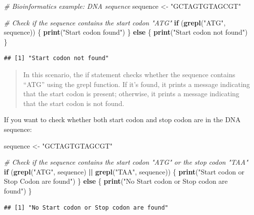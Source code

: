 \documentclass[
]{book}
\newenvironment{Shaded}{\begin{snugshade}}{\end{snugshade}}
\newcommand{\CommentTok}[1]{\textcolor[rgb]{0.56,0.35,0.01}{\textit{#1}}}
\newcommand{\ControlFlowTok}[1]{\textcolor[rgb]{0.13,0.29,0.53}{\textbf{#1}}}
\newcommand{\FunctionTok}[1]{\textcolor[rgb]{0.13,0.29,0.53}{\textbf{#1}}}
\newcommand{\NormalTok}[1]{#1}
\newcommand{\OtherTok}[1]{\textcolor[rgb]{0.56,0.35,0.01}{#1}}
\newcommand{\SpecialCharTok}[1]{\textcolor[rgb]{0.81,0.36,0.00}{\textbf{#1}}}
\newcommand{\StringTok}[1]{\textcolor[rgb]{0.31,0.60,0.02}{#1}}
\begin{document}
\begin{Shaded}
\begin{Highlighting}[]
\CommentTok{\# Bioinformatics example: DNA sequence}
\NormalTok{sequence }\OtherTok{\textless{}{-}} \StringTok{"GCTAGTGTAGCGT"}

\CommentTok{\# Check if the sequence contains the start codon "ATG"}
\ControlFlowTok{if}\NormalTok{ (}\FunctionTok{grepl}\NormalTok{(}\StringTok{"ATG"}\NormalTok{, sequence)) \{}
    \FunctionTok{print}\NormalTok{(}\StringTok{"Start codon found"}\NormalTok{)}
\NormalTok{\} }\ControlFlowTok{else}\NormalTok{ \{}
    \FunctionTok{print}\NormalTok{(}\StringTok{"Start codon not found"}\NormalTok{)}
\NormalTok{\}}
\end{Highlighting}
\end{Shaded}

\begin{verbatim}
## [1] "Start codon not found"
\end{verbatim}

\begin{quote}
In this scenario, the if statement checks whether the sequence contains ``ATG'' using the grepl function. If it's found, it prints a message indicating that the start codon is present; otherwise, it prints a message indicating that the start codon is not found.
\end{quote}

If you want to check whether both start codon and stop codon are in the DNA sequence:

\begin{Shaded}
\begin{Highlighting}[]
\NormalTok{sequence }\OtherTok{\textless{}{-}} \StringTok{"GCTAGTGTAGCGT"}

\CommentTok{\# Check if the sequence contains the start codon "ATG" or the stop codon "TAA"}
\ControlFlowTok{if}\NormalTok{ (}\FunctionTok{grepl}\NormalTok{(}\StringTok{"ATG"}\NormalTok{, sequence) }\SpecialCharTok{||} \FunctionTok{grepl}\NormalTok{(}\StringTok{"TAA"}\NormalTok{, sequence)) \{}
    \FunctionTok{print}\NormalTok{(}\StringTok{"Start codon or Stop Codon are found"}\NormalTok{)}
\NormalTok{\} }\ControlFlowTok{else}\NormalTok{ \{}
    \FunctionTok{print}\NormalTok{(}\StringTok{"No Start codon or Stop codon are found"}\NormalTok{)}
\NormalTok{\}}
\end{Highlighting}
\end{Shaded}

\begin{verbatim}
## [1] "No Start codon or Stop codon are found"
\end{verbatim}
\end{document}
